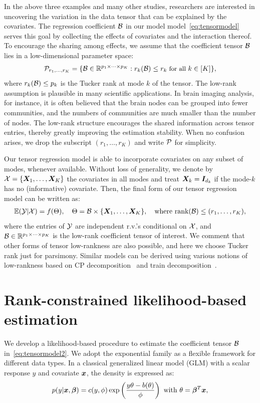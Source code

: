 \documentclass{article}
\theoremstyle{plain}
\theoremstyle{definition}
\begin{document}
In the above three examples and many other studies, researchers are interested in uncovering the variation in the data tensor that can be explained by the covariates. The regression coefficient $\mathcal{B}$ in our model model~\eqref{eq:tensormodel} serves this goal by collecting the effects of covariates and the interaction thereof.  
To encourage the sharing among effects, we assume that the coefficient tensor $\mathcal{B}$ lies in a low-dimensional parameter space:
\begin{equation}\label{eq:rank}
\small \tP_{r_1,\ldots,r_K}=\{\tB\in\mathbb{R}^{p_1\times \cdots \times p_K}: r_k(\tB)\leq r_k \text{ for all } k\in[K]\},
\end{equation}
where $r_k(\mathcal{B})\leq p_k$ is the Tucker rank at mode $k$ of the tensor. The low-rank assumption is plausible in many scientific applications. In brain imaging analysis, for instance, it is often believed that the brain nodes can be grouped into fewer communities, and the numbers of communities are much smaller than the number of nodes. The low-rank structure encourages the shared information across tensor entries, thereby greatly improving the estimation stability. When no confusion arises, we drop the subscript $(r_1,\ldots,r_K)$ and write $\mathcal{P}$ for simplicity.


Our tensor regression model is able to incorporate covariates on any subset of modes, whenever available. Without loss of generality, we denote by $\mathcal{X}=\{\bm X_1,\ldots,\bm X_K\}$ the covariates in all modes and treat $\bm X_k=\bm I_{d_k}$ if the mode-$k$ has no (informative) covariate. Then, the final form of our tensor regression model can be written as:
\begin{align}\label{eq:tensormodel2}
\mathbb{E}(\tY|\tX)=f(\Theta),\quad \Theta =\tB\times\{\mX_1,\ldots,\mX_K\},\quad  \text{where}\ \text{rank}(\tB)\leq (r_1,\ldots,r_K),
\end{align}
where the entries of $\mathcal{Y}$ are independent r.v.'s conditional on $\mathcal{X}$, and $\mathcal{B}\in\mathbb{R}^{p_1\times \cdots\times p_K}$ is the low-rank coefficient tensor of interest. We comment that other forms of tensor low-rankness are also possible, and here we choose Tucker rank just for parsimony. Similar models can be derived using various notions of low-rankness based on CP decomposition~\cite{hitchcock1927expression} and train decomposition~\cite{oseledets2011tensor}. 
\vspace{-.2cm}
\section{Rank-constrained likelihood-based estimation}
\vspace{-.2cm}
We develop a likelihood-based procedure to estimate the coefficient tensor $\mathcal{B}$ in~\eqref{eq:tensormodel2}. We adopt the exponential family as a flexible framework for different data types. In a classical generalized linear model (GLM) with a scalar response $y$ and covariate $\bm x$, the density is expressed as:
\vspace{-.03cm}
\begin{equation*}
  p(y|\bm x, \boldsymbol{\beta})=c(y,\phi)\exp\left(\frac{y\theta- b(\theta) }{ \phi}\right)\ \text{with}\ \theta=\boldsymbol{\beta}^T\bm x,
\end{equation*}
\end{document}
